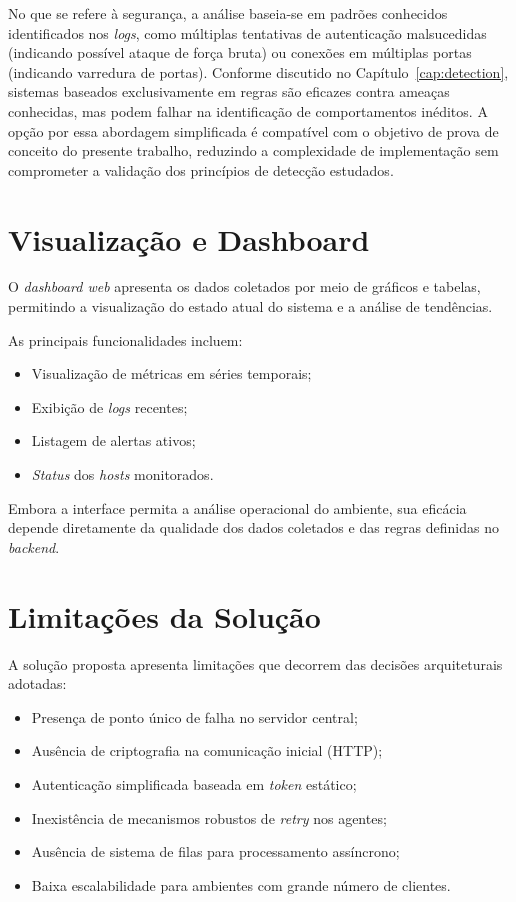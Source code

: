 \documentclass[
    12pt
    ,oneside
    ,a4paper
    ,chapter=TITLE
    ,section=TITLE
    ,sumario=abnt-6027-2012]{abntex2}
\begin{document}
No que se refere à segurança, a análise baseia-se em padrões conhecidos identificados nos \textit{logs}, como múltiplas tentativas de autenticação malsucedidas (indicando possível ataque de força bruta) ou conexões em múltiplas portas (indicando varredura de portas). Conforme discutido no Capítulo~\ref{cap:detection}, sistemas baseados exclusivamente em regras são eficazes contra ameaças conhecidas, mas podem falhar na identificação de comportamentos inéditos. A opção por essa abordagem simplificada é compatível com o objetivo de prova de conceito do presente trabalho, reduzindo a complexidade de implementação sem comprometer a validação dos princípios de detecção estudados.

\section{Visualização e Dashboard}

O \textit{dashboard web} apresenta os dados coletados por meio de gráficos e tabelas, permitindo a visualização do estado atual do sistema e a análise de tendências.

As principais funcionalidades incluem:

\begin{itemize}
    \item Visualização de métricas em séries temporais;
    \item Exibição de \textit{logs} recentes;
    \item Listagem de alertas ativos;
    \item \textit{Status} dos \textit{hosts} monitorados.
\end{itemize}

Embora a interface permita a análise operacional do ambiente, sua eficácia depende diretamente da qualidade dos dados coletados e das regras definidas no \textit{backend}.

\section{Limitações da Solução}

A solução proposta apresenta limitações que decorrem das decisões arquiteturais adotadas:

\begin{itemize}
    \item Presença de ponto único de falha no servidor central;
    \item Ausência de criptografia na comunicação inicial (HTTP);
    \item Autenticação simplificada baseada em \textit{token} estático;
    \item Inexistência de mecanismos robustos de \textit{retry} nos agentes;
    \item Ausência de sistema de filas para processamento assíncrono;
    \item Baixa escalabilidade para ambientes com grande número de clientes.
\end{itemize}
\end{document}

